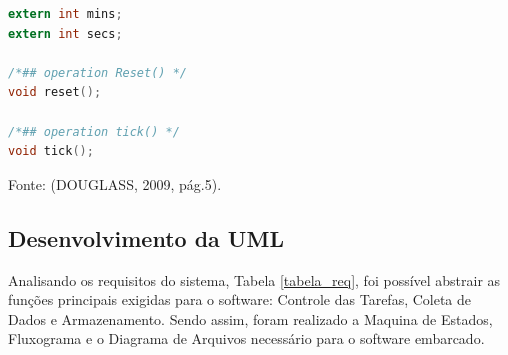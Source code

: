 \renewcommand{\lstlistingname}{Código}


\begin{lstlisting}[caption={Transcrição do Timer UML para código em C.},label={lst:codigo3},language=C]
extern int mins; 
extern int secs;

/*## operation Reset() */
void reset();

/*## operation tick() */
void tick();

\end{lstlisting}
\begin{center}
Fonte: (DOUGLASS, 2009, pág.5).
\end{center}

\subsection{Desenvolvimento da UML}

Analisando os requisitos do sistema, Tabela \ref{tabela_req}, foi possível abstrair as funções principais exigidas para o software: Controle das Tarefas, Coleta de Dados e Armazenamento. Sendo assim, foram realizado a Maquina de Estados, Fluxograma e o Diagrama de Arquivos necessário para o software embarcado. 


